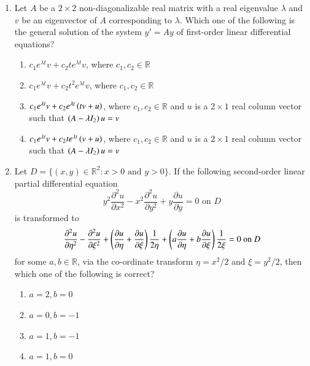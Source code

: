 \documentclass[journal,12pt,onecolumn]{IEEEtran}
\theoremstyle{remark}
\begin{document}
\begin{enumerate}
\item Let $A$ be a $2 \times 2$ non-diagonalizable real matrix with a real eigenvalue $\lambda$ and $v$ be an eigenvector of $A$ corresponding to $\lambda$. Which one of the following is the general solution of the system $y' = Ay$ of first-order linear differential equations? \hfill{}
\begin{enumerate}
    \item $c_1 e^{\lambda t} v + c_2 t e^{\lambda t} v$, where $c_1, c_2 \in \mathbb{R}$
    \item $c_1 e^{\lambda t} v + c_2 t^2 e^{\lambda t} v$, where $c_1, c_2 \in \mathbb{R}$
    \item $c_1 e^{\lambda t} v + c_2 e^{\lambda t} \left(tv + u\right)$, where $c_1, c_2 \in \mathbb{R}$ and $u$ is a $2 \times 1$ real column vector such that $\left(A - \lambda I_2\right)u = v$
    \item $c_1 e^{\lambda t} v + c_2 t e^{\lambda t} \left(v + u\right)$, where $c_1, c_2 \in \mathbb{R}$ and $u$ is a $2 \times 1$ real column vector such that $\left(A - \lambda I_2\right)u = v$
\end{enumerate}

\item Let $D = \{(x, y) \in \mathbb{R}^2 \colon x > 0 \text{ and } y > 0\}$. If the following second-order linear partial differential equation
\[ y^2 \frac{\partial^2 u}{\partial x^2} - x^2 \frac{\partial^2 u}{\partial y^2} + y \frac{\partial u}{\partial y} = 0 \text{ on } D \]
is transformed to
\[ \frac{\partial^2 u}{\partial \eta^2} - \frac{\partial^2 u}{\partial \xi^2} + \left(\frac{\partial u}{\partial \eta} + \frac{\partial u}{\partial \xi}\right) \frac{1}{2\eta} + \left(a\frac{\partial u}{\partial \eta} + b\frac{\partial u}{\partial \xi}\right) \frac{1}{2\xi} = 0 \text{ on } D \]
for some $a, b \in \mathbb{R}$, via the co-ordinate transform $\eta = x^2/2$ and $\xi = y^2/2$, then which one of the following is correct? \hfill{}
\begin{enumerate}
    \item $a = 2, b = 0$
    \item $a = 0, b = -1$
    \item $a = 1, b = -1$
    \item $a = 1, b = 0$
\end{enumerate}


\end{enumerate}
\end{document}

